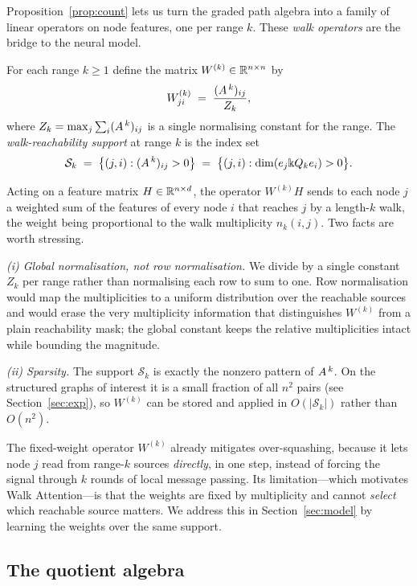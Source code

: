 Proposition~\ref{prop:count} lets us turn the graded path algebra into a family of
linear operators on node features, one per range $k$. These \emph{walk operators}
are the bridge to the neural model.

\begin{definition}\label{def:walkop}
For each range $k\ge 1$ define the matrix $W^{(k)}\in\mathbb{R}^{n\times n}$ by
\[
  W^{(k)}_{j i}\;=\;\frac{(A^{\,k})_{ij}}{\,Z_k\,},
\]
where $Z_k=\max_{j}\sum_i (A^{\,k})_{ij}$ is a single normalising constant for
the range. The \emph{walk-reachability support} at range $k$ is the index set
\[
  \mathcal{S}_k \;=\; \bigl\{(j,i): (A^{\,k})_{ij}>0\bigr\}
  \;=\;\bigl\{(j,i): \dim(e_j\Bbbk Q_k e_i)>0\bigr\}.
\]
\end{definition}

Acting on a feature matrix $H\in\mathbb{R}^{n\times d}$, the operator $W^{(k)}H$ sends to
each node $j$ a weighted sum of the features of every node $i$ that reaches $j$ by
a length-$k$ walk, the weight being proportional to the walk multiplicity
$n_k(i,j)$. Two facts are worth stressing.

\emph{(i) Global normalisation, not row normalisation.} We divide by a single
constant $Z_k$ per range rather than normalising each row to sum to one. Row
normalisation would map the multiplicities to a uniform distribution over the
reachable sources and would erase the very multiplicity information that
distinguishes $W^{(k)}$ from a plain reachability mask; the global constant keeps
the relative multiplicities intact while bounding the magnitude.

\emph{(ii) Sparsity.} The support $\mathcal{S}_k$ is exactly the nonzero pattern
of $A^{\,k}$. On the structured graphs of interest it is a small fraction of
all $n^2$ pairs (see Section~\ref{sec:exp}), so $W^{(k)}$ can be stored and
applied in $O(|\mathcal{S}_k|)$ rather than $O(n^2)$.

The fixed-weight operator $W^{(k)}$ already mitigates over-squashing, because it
lets node $j$ read from range-$k$ sources \emph{directly}, in one step, instead
of forcing the signal through $k$ rounds of local message passing. Its
limitation---which motivates Walk Attention---is that the weights are fixed by
multiplicity and cannot \emph{select} which reachable source matters. We address
this in Section~\ref{sec:model} by learning the weights over the same support.

\subsection{The quotient algebra}

